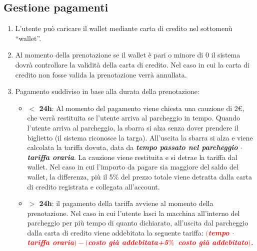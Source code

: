 \subsection{Gestione pagamenti}
\begin{enumerate}[start=22,label={\bfseries RF\arabic*}]
    \item \label{itm:RF22} L’utente può caricare il wallet mediante carta di credito nel sottomenù “wallet”.
    \item \label{itm:RF23} Al momento della prenotazione se il wallet è pari o minore di 0 il sistema dovrà controllare la validità della carta di credito. Nel caso in cui la carta di credito non fosse valida la prenotazione verrà annullata.
    \item \label{itm:RF24} Pagamento suddiviso in base alla durata della prenotazione:
    \begin{itemize}
        \item \textbf{$<$ 24h}: Al momento del pagamento viene chiesta una cauzione di 2€, che verrà restituita se l’utente arriva al parcheggio in tempo.
        Quando l’utente arriva al parcheggio, la sbarra si alza senza dover prendere il biglietto (il sistema riconosce la targa). All’uscita la sbarra si alza e viene calcolata la tariffa dovuta, data da \textbf{\textit{tempo passato nel parcheggio} $\cdot$ \textit{tariffa oraria}}. La cauzione viene restituita e si detrae la tariffa dal wallet. Nel caso in cui l’importo da pagare sia maggiore del saldo del wallet, la differenza, più il 5\% del prezzo totale viene detratta dalla carta di credito registrata e collegata all’account.
        \item \textbf{$>$ 24h}: il pagamento della tariffa avviene al momento della prenotazione. Nel caso in cui l’utente lasci la macchina all’interno del parcheggio per più tempo di quanto dichiarato, all’uscita dal parcheggio dalla carta di credito viene addebitata la seguente tariffa: \textcolor{red}{\textbf{\textit{$($tempo $\cdot$ tariffa oraria$)-($costo già addebitata+5$\%$~costo già addebitato$)$.}}}
    \end{itemize}
\end{enumerate}
